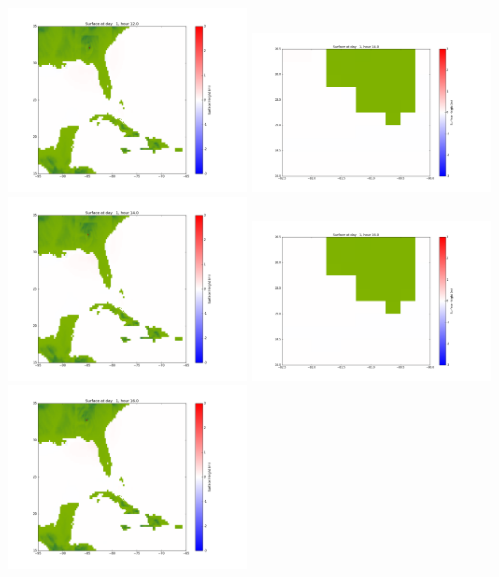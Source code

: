 \documentclass[11pt]{article}
\begin{document}
\includegraphics[width=0.475\textwidth]{frame0042fig1002.png}
\vskip 10pt 
\includegraphics[width=0.475\textwidth]{frame0043fig1001.png}
\includegraphics[width=0.475\textwidth]{frame0043fig1002.png}
\vskip 10pt 
\includegraphics[width=0.475\textwidth]{frame0044fig1001.png}
\includegraphics[width=0.475\textwidth]{frame0044fig1002.png}
\end{document}
